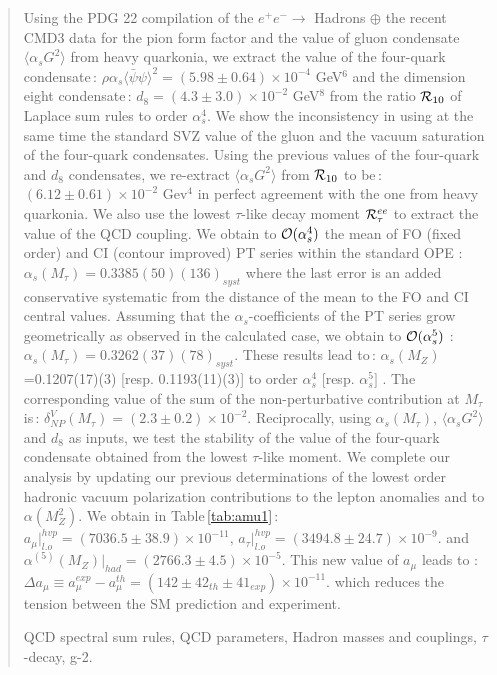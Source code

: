 \documentclass[review]{elsarticle}
\def\la{\langle}
\def\ra{\rangle}
\begin{document}
\begin{frontmatter}
\date{\today}
\begin{abstract}
\noindent
Using the PDG 22 compilation of the $e^+e^-\to$  Hadrons $\oplus$ the recent CMD3 data for the pion form factor and the value of gluon condensate $\la\alpha_s G^2\ra$ from heavy quarkonia, we extract the value of the four-quark condensate\,:  $\rho\alpha_s\la\bar\psi\psi\ra^2= (5.98\pm 0.64)\times 10^{-4}$ GeV$^6$  and 
the dimension eight condensate\,: $d_8= (4.3\pm 3.0)\times 10^{-2}$ GeV$^8$
from the ratio ${\cal R}_{10}$ of Laplace sum rules to order $\alpha_s^4$.  We show the inconsistency in using at the same time the standard SVZ value of the gluon and the vacuum saturation of the four-quark condensates.  Using the previous values of the four-quark and $d_8$ condensates, we re-extract $\la\alpha_s G^2\ra$ from ${\cal R}_{10}$ to be\,:  $(6.12\pm 0.61)\times 10^{-2}$ Gev$^4$ in perfect agreement with the one from heavy quarkonia. We also use
the lowest $\tau$-like decay moment ${\cal R}_\tau^{ee}$ to extract the value of the QCD coupling. We obtain to  ${\cal O}(\alpha_s^4)$ the mean of FO (fixed order) and CI (contour improved)  PT series within the standard OPE : $\alpha_s(M_\tau)=0.3385(50)(136)_{syst}$ where the last error is an added conservative systematic from the distance of the mean to  the FO and CI central values. Assuming that the $\alpha_s$-coefficients of the PT series grow geometrically as observed in the calculated case, we obtain to ${\cal O}(\alpha_s^5)$ :   $\alpha_s(M_\tau)=0.3262(37)(78)_{syst}$.  These  results lead to\,: $\alpha_s(M_Z)$=0.1207(17)(3) [resp. 0.1193(11)(3)] to order $\alpha_s^4$ [resp. $\alpha_s^5]$ . The corresponding value of the sum of the non-perturbative contribution at $M_\tau$ is\,: $\delta^V_{NP}(M_\tau)=(2.3\pm 0.2)\times 10^{-2}$. Reciprocally, using $\alpha_s(M_\tau)$, $\la\alpha_s G^2\ra$ and $d_8$ as inputs, we test the stability of the value of the four-quark condensate obtained from the lowest $\tau$-like moment. 
We complete our analysis by updating our previous determinations of the lowest order hadronic vacuum polarization  contributions to the lepton anomalies and to $\alpha(M^2_Z)$.  We obtain in Table\,\ref{tab:amu1}\,: $a_\mu\vert^{hvp}_{l.o}= (7036.5\pm 38.9)\times10^{-11}, \, a_\tau\vert^{hvp}_{l.o}= (3494.8\pm 24.7)\times10^{-9} $. and $\alpha^{(5)}(M_Z)\vert_{had}=(2766.3\pm 4.5)\times 10^{-5}$. This new value of $a_\mu$ leads to : $\Delta a_\mu\equiv a_\mu^{exp}-a_\mu^{th} = (142\pm 42_{th}\pm 41_{exp})\times 10^{-11}$. which reduces the tension between the SM prediction and experiment.
\begin{keyword}  QCD spectral sum rules, QCD parameters,  Hadron masses and couplings, $\tau$-decay, g-2.


\end{keyword}
\end{abstract}
\end{frontmatter}
\end{document}
